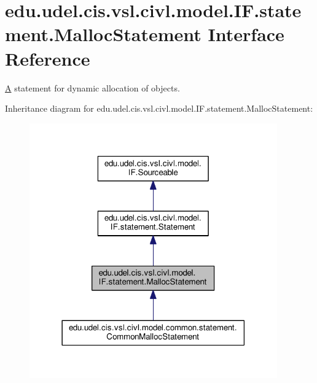 \hypertarget{interfaceedu_1_1udel_1_1cis_1_1vsl_1_1civl_1_1model_1_1IF_1_1statement_1_1MallocStatement}{}\section{edu.\+udel.\+cis.\+vsl.\+civl.\+model.\+I\+F.\+statement.\+Malloc\+Statement Interface Reference}
\label{interfaceedu_1_1udel_1_1cis_1_1vsl_1_1civl_1_1model_1_1IF_1_1statement_1_1MallocStatement}


\hyperlink{structA}{A} statement for dynamic allocation of objects.  




Inheritance diagram for edu.\+udel.\+cis.\+vsl.\+civl.\+model.\+I\+F.\+statement.\+Malloc\+Statement\+:
\nopagebreak
\begin{figure}[H]
\begin{center}
\leavevmode
\includegraphics[width=302pt]{interfaceedu_1_1udel_1_1cis_1_1vsl_1_1civl_1_1model_1_1IF_1_1statement_1_1MallocStatement__inherit__graph}
\end{center}
\end{figure}


